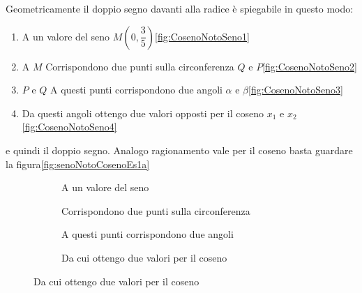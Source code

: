Geometricamente il doppio segno davanti alla radice è spiegabile in questo modo:
\begin{enumerate}
	\item A un valore del seno $M(0,\dfrac{3}{5})$\nobs\vref{fig:CosenoNotoSeno1}
	\item A $M$ Corrispondono due punti sulla circonferenza $Q$ e $P$\nobs\vref{fig:CosenoNotoSeno2}
	\item $P$ e $Q$ A questi punti corrispondono due angoli $\alpha$ e $\beta$\nobs\vref{fig:CosenoNotoSeno3}
	\item  Da questi angoli ottengo due valori opposti per il coseno $x_1$ e $x_2$\nobs\vref{fig:CosenoNotoSeno4}
	\end{enumerate}
e quindi il doppio segno.
Analogo ragionamento vale per il coseno basta guardare la figura\nobs\vref{fig:senoNotoCosenoEs1a}
\begin{figure}
	\begin{subfigure}[b]{.5\linewidth}
		\centering
			\caption{A un valore del seno}\label{fig:CosenoNotoSeno1}
	\end{subfigure}%
	\begin{subfigure}[b]{.5\linewidth}
		\centering
			\caption{Corrispondono due punti sulla circonferenza}\label{fig:CosenoNotoSeno2}
	\end{subfigure}
	\begin{subfigure}[b]{.5\linewidth}
		\centering
			\caption{A questi punti corrispondono due angoli}\label{fig:CosenoNotoSeno3}
	\end{subfigure}%
	\begin{subfigure}[b]{.5\linewidth}
		\centering
			\caption{Da cui ottengo due valori per il coseno}\label{fig:CosenoNotoSeno4}
	\end{subfigure}
	\label{fig:CosenoNotoSenoEs1}
\end{figure}
